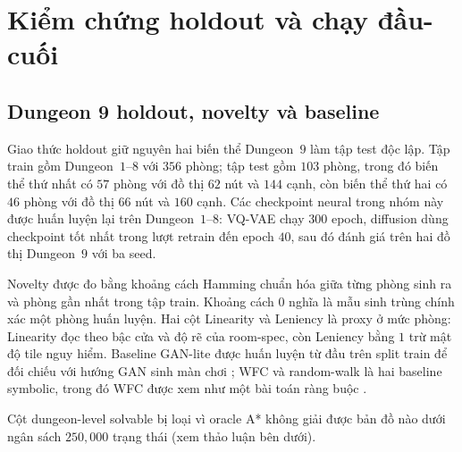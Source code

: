 \documentclass[oneside,a4paper,12pt]{extreport}
\begin{document}
\section{Kiểm chứng holdout và chạy đầu-cuối}
\subsection{Dungeon 9 holdout, novelty và baseline}
\label{subsec:dungeon9_holdout_protocol}
Giao thức holdout giữ nguyên hai biến thể Dungeon~$9$ làm tập test độc lập. Tập train gồm Dungeon~$1$--$8$ với $356$ phòng; tập test gồm $103$ phòng, trong đó biến thể thứ nhất có $57$ phòng với đồ thị $62$ nút và $144$ cạnh, còn biến thể thứ hai có $46$ phòng với đồ thị $66$ nút và $160$ cạnh. Các checkpoint neural trong nhóm này được huấn luyện lại trên Dungeon~$1$--$8$: VQ-VAE chạy $300$ epoch, diffusion dùng checkpoint tốt nhất trong lượt retrain đến epoch $40$, sau đó đánh giá trên hai đồ thị Dungeon~$9$ với ba seed.

Novelty được đo bằng khoảng cách Hamming chuẩn hóa giữa từng phòng sinh ra và phòng gần nhất trong tập train. Khoảng cách $0$ nghĩa là mẫu sinh trùng chính xác một phòng huấn luyện. Hai cột Linearity và Leniency là proxy ở mức phòng: Linearity đọc theo bậc cửa và độ rẽ của room-spec, còn Leniency bằng $1$ trừ mật độ tile nguy hiểm. Baseline GAN-lite được huấn luyện từ đầu trên split train để đối chiếu với hướng GAN sinh màn chơi \cite{volz2018mariogan,rodriguez2019bootstrapping}; WFC và random-walk là hai baseline symbolic, trong đó WFC được xem như một bài toán ràng buộc \cite{karth2021wfc}.

\begin{table}[H]
\centering
\small
\setlength{\tabcolsep}{4pt}
\caption{Novelty, playability và baseline trên giao thức Dungeon 9 holdout}
\label{tab:dungeon9_holdout_baselines}
\vspace{2pt}
{\raggedright\tiny Cột dungeon-level solvable bị loại vì oracle A* không giải được bản đồ nào dưới ngân sách $250{,}000$ trạng thái (xem thảo luận bên dưới).\par}
\end{table}
\end{document}
